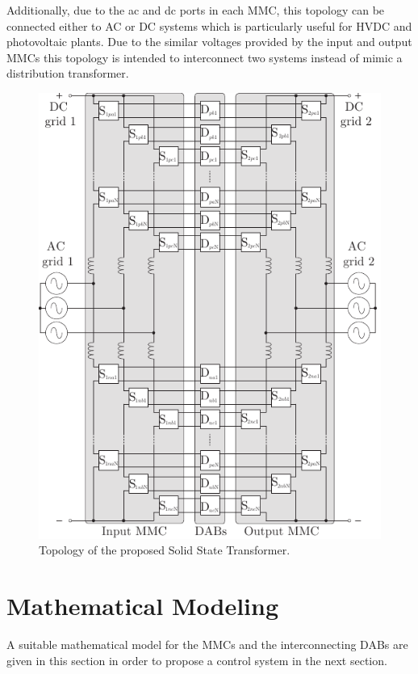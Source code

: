 \documentclass[conference]{IEEEtran}
\begin{document}
Additionally, due to the ac and dc ports in each MMC, this topology can be connected either to AC or DC systems which is particularly useful for HVDC and  photovoltaic plants. Due to the similar voltages provided by the input and output MMCs this topology is intended to interconnect two systems instead of mimic a distribution transformer.


\begin{figure}[!t]
\centering
\includegraphics[width=\columnwidth]{images/topology.pdf}
\caption{Topology of the proposed Solid State Transformer.}
\label{fig:topology}
\end{figure}





\section{Mathematical Modeling}
A suitable mathematical model for the MMCs and the interconnecting DABs are given in this section in order to propose a control system in the next section.
\end{document}
